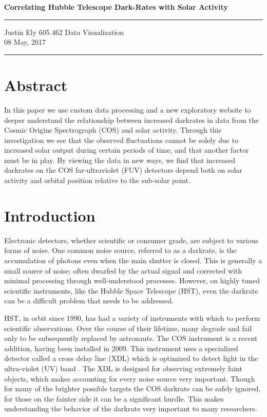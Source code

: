 \documentclass[a4paper,11pt]{article}
\begin{document}
\begin{flushright}

\vspace{1.1cm}

{\bf\Huge Correlating Hubble Telescope Dark-Rates with Solar Activity}

\rule{0.25\linewidth}{0.5pt}

\vspace{0.5cm}
Justin Ely
\linebreak
\footnotesize{605.462 Data Visualization \\}
08 May, 2017
\end{flushright}

\noindent\rule{\linewidth}{1.0pt}


\section{Abstract}
In this paper we use custom data processing and a new exploratory website to deeper understand the 
relationship between increased darkrates in data from the Cosmic Origins Spectrograph (COS) and solar activity.  
Through this investigation we see that the observed fluctuations cannot be solely due to increased solar output
during certain periods of time, and that another factor must be in play.  By viewing the data in new ways, we find 
that increased darkrates on the COS far-ultraviolet (FUV) detectors depend both on solar activity and orbital position relative to the sub-solar point.   

\section{Introduction}
Electronic detectors, whether scientific or consumer grade, are subject to various forms of noise.  One common 
noise source, referred to as a darkrate,  is the accumulation of photons even when the main shutter is closed.  This is
generally a small source of noise; often dwarfed by the actual signal and corrected with minimal processing 
through well-understood processes.  However, on highly tuned scientific instruments, like the 
Hubble Space Telescope (HST), even the darkrate can be a difficult problem that needs to be addressed.

HST, in orbit since 1990, has had a variety of instruments with which to perform scientific observations.  Over the course of
their lifetime, many degrade and fail only to be subsequently replaced by astronauts.  The COS instrument is a recent addition,
having been installed in 2009.  This instrument uses a specialized detector called a cross delay line (XDL) 
which is optimized to detect light in the ultra-violet (UV) band \cite{fox}. The XDL is designed for 
observing extremely faint objects, which makes accounting for every noise source very important.  Though for
many of the brighter possible targets the COS darkrate can be safely ignored, for those on the fainter side it can 
be a significant hurdle.  This makes understanding the behavior of the darkrate very important to many researchers.
\end{document}
